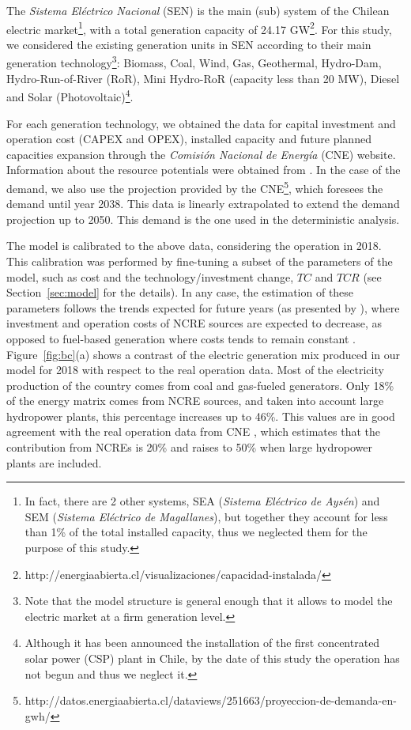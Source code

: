 \documentclass[11pt, letterpaper]{article}
\begin{document}
The \textit{Sistema El\'ectrico Nacional} (SEN) is the main (sub) system of the Chilean electric market\footnote{In fact, there are 2 other systems, SEA (\textit{Sistema El\'ectrico de Ays\'en}) and SEM (\textit{Sistema El\'ectrico de Magallanes}), but together they account  for less than 1\% of the total installed capacity, thus we neglected them for the purpose of this study.},  with a total generation capacity of 24.17 GW\footnote{http://energiaabierta.cl/visualizaciones/capacidad-instalada/}. For this study, we considered the existing generation units in SEN according to their main generation technology\footnote{Note that the model structure is general enough that it allows to model the electric market at a firm generation level.}: Biomass, Coal, Wind, Gas, Geothermal, Hydro-Dam, Hydro-Run-of-River (RoR), Mini Hydro-RoR (capacity less than 20 MW), Diesel and Solar (Photovoltaic)\footnote{ Although it has been announced the installation of the first concentrated solar power (CSP) plant in Chile, by the date of this study the operation has not begun and thus we neglect it. }.

\smallskip

For each generation technology, we obtained the data for capital investment and operation cost (CAPEX and OPEX), installed capacity and future planned capacities expansion through the \textit{Comisi\'on Nacional de Energ\'ia} (CNE) website. Information about the resource potentials were obtained from \cite{Santana2014potencial}.
In the case of the demand, we also use the projection provided by the CNE\footnote{http://datos.energiaabierta.cl/dataviews/251663/proyeccion-de-demanda-en-gwh/}, which foresees the demand until year 2038. This data is linearly extrapolated to extend the demand projection up to 2050. This demand  is the one used in the deterministic analysis.

\smallskip

The model is calibrated to the above data, considering the operation in 2018. This calibration was performed by fine-tuning a subset of the parameters of the model, such as cost and the technology/investment change, $TC$ and $TCR$ (see Section~\ref{sec:model} for the details). In any case, the estimation of these parameters follows the trends expected for future years (as presented by \cite{Mena2019csp,NRELcosts}), where investment and operation costs of NCRE sources are expected to decrease, as opposed to fuel-based generation where costs tends to remain constant \cite{Mena2019csp,NRELcosts}.
Figure~\ref{fig:bc}(a) shows a contrast of the electric generation mix produced in our model for 2018 with respect to the real operation data. Most of the electricity production of the country comes from coal and gas-fueled generators. Only 18\% of the energy matrix comes from NCRE sources, and taken into account large hydropower plants, this percentage increases up to  46\%. This values are in good agreement with the real operation data from CNE \cite{CNE2018}, which estimates that the contribution from NCREs is 20\% and raises to 50\% when large hydropower plants are included. 
\end{document}
